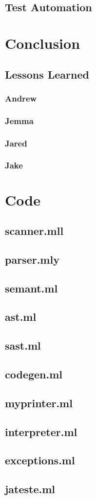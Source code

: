 \documentclass{article}
\begin{document}
\subsection{Test Automation}


\section{Conclusion}
\subsection{Lessons Learned}
\subsubsection{Andrew}
\subsubsection{Jemma}
\subsubsection{Jared}
\subsubsection{Jake}

\section{Code}
\subsection{scanner.mll}
\subsection{parser.mly}
\subsection{semant.ml}
\subsection{ast.ml}
\subsection{sast.ml}
\subsection{codegen.ml}
\subsection{myprinter.ml}
\subsection{interpreter.ml}
\subsection{exceptions.ml}
\subsection{jateste.ml}
\end{document}

